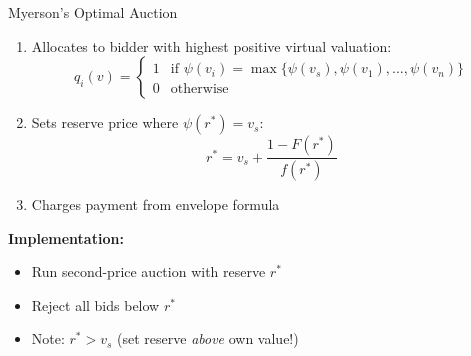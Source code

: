 \documentclass[xcolor={x11names}, aspectratio=169 ]{beamer}
\begin{document}
\begin{frame}{Myerson's Optimal Auction}
\begin{theorem}
\begin{enumerate}
  \item Allocates to bidder with highest positive virtual valuation:
  $$q_i(v) = \begin{cases} 1 & \text{if } \psi(v_i) = \max\{\psi(v_s), \psi(v_1), \ldots, \psi(v_n)\} \\ 0 & \text{otherwise} \end{cases}$$
  \item Sets reserve price where $\psi(r^*) = v_s$:
  $$r^* = v_s + \frac{1-F(r^*)}{f(r^*)}$$
  \item Charges payment from envelope formula
\end{enumerate}
\end{theorem}

\textbf{Implementation:}
\begin{itemize}
  \item Run second-price auction with reserve $r^*$
  \item Reject all bids below $r^*$
  \item Note: $r^* > v_s$ (set reserve \emph{above} own value!)
\end{itemize}
\end{frame}
\end{document}
